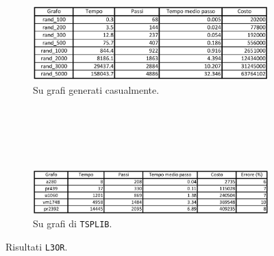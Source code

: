 \begin{figure}[H]
    \centering
    \begin{subfigure}{\linewidth}
        \centering
        \includegraphics[width=400pt]{img/L3ORrandom.png}
        \caption*{Su grafi generati casualmente.}
    \end{subfigure}
    \ \\
    \ \\
    \ \\
    \ \\
    \begin{subfigure}{\linewidth}
        \centering
        \includegraphics[width=400pt]{img/L3ORtsplib.png}
        \caption*{Su grafi di \texttt{TSPLIB}.}
    \end{subfigure}
    \caption{Risultati \texttt{L3OR}.}
\end{figure}
\ \\

